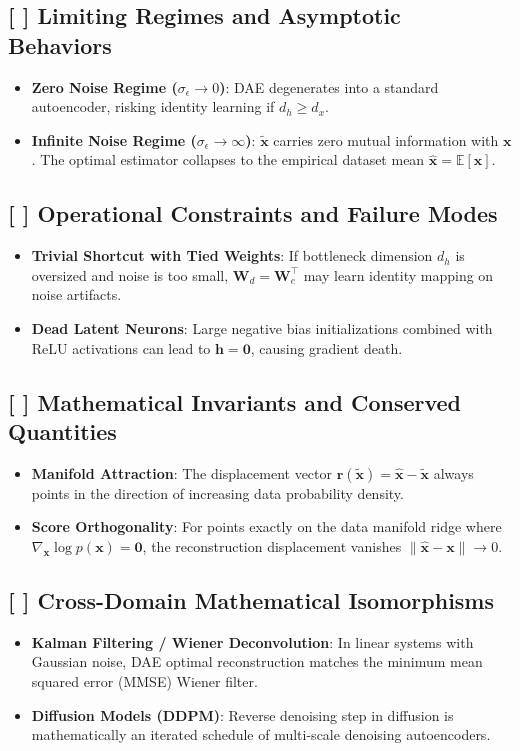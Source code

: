 \documentclass[11pt,a4paper]{article}
\theoremstyle{definition}
\begin{document}
\subsection{[ ] Limiting Regimes and Asymptotic Behaviors}
\begin{itemize}
    \item \textbf{Zero Noise Regime ($\sigma_\epsilon \to 0$)}: DAE degenerates into a standard autoencoder, risking identity learning if $d_h \ge d_x$.
    \item \textbf{Infinite Noise Regime ($\sigma_\epsilon \to \infty$)}: $\tilde{\mathbf{x}}$ carries zero mutual information with $\mathbf{x}$. The optimal estimator collapses to the empirical dataset mean $\hat{\mathbf{x}} = \mathbb{E}[\mathbf{x}]$.
\end{itemize}

\subsection{[ ] Operational Constraints and Failure Modes}
\begin{itemize}
    \item \textbf{Trivial Shortcut with Tied Weights}: If bottleneck dimension $d_h$ is oversized and noise is too small, $\mathbf{W}_d = \mathbf{W}_e^\top$ may learn identity mapping on noise artifacts.
    \item \textbf{Dead Latent Neurons}: Large negative bias initializations combined with ReLU activations can lead to $\mathbf{h} = \mathbf{0}$, causing gradient death.
\end{itemize}

\subsection{[ ] Mathematical Invariants and Conserved Quantities}
\begin{itemize}
    \item \textbf{Manifold Attraction}: The displacement vector $\mathbf{r}(\tilde{\mathbf{x}}) = \hat{\mathbf{x}} - \tilde{\mathbf{x}}$ always points in the direction of increasing data probability density.
    \item \textbf{Score Orthogonality}: For points exactly on the data manifold ridge where $\nabla_{\mathbf{x}} \log p(\mathbf{x}) = \mathbf{0}$, the reconstruction displacement vanishes $\|\hat{\mathbf{x}} - \mathbf{x}\| \to 0$.
\end{itemize}

\subsection{[ ] Cross-Domain Mathematical Isomorphisms}
\begin{itemize}
    \item \textbf{Kalman Filtering / Wiener Deconvolution}: In linear systems with Gaussian noise, DAE optimal reconstruction matches the minimum mean squared error (MMSE) Wiener filter.
    \item \textbf{Diffusion Models (DDPM)}: Reverse denoising step in diffusion is mathematically an iterated schedule of multi-scale denoising autoencoders.
\end{itemize}
\end{document}
